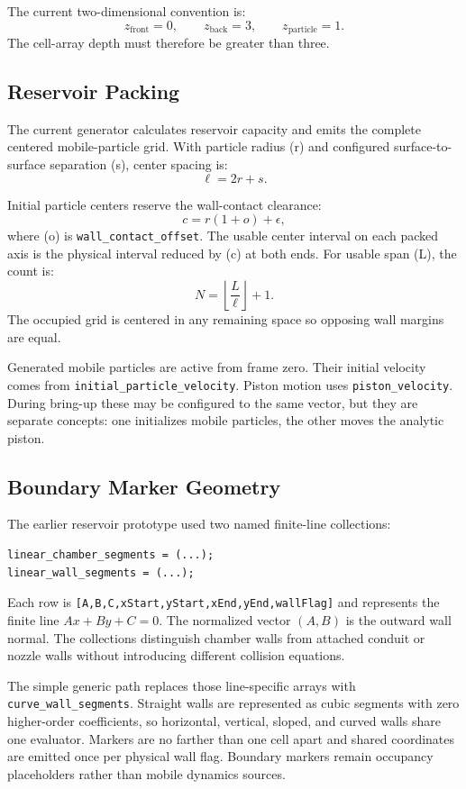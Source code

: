 The current two-dimensional convention is:
\[
z_{\mathrm{front}}=0,\qquad
z_{\mathrm{back}}=3,\qquad
z_{\mathrm{particle}}=1.
\]
The cell-array depth must therefore be greater than three.

\subsection{Reservoir Packing}

The current generator calculates reservoir capacity and emits the complete
centered mobile-particle grid.  With particle radius (r) and configured
surface-to-surface separation (s), center spacing is:
\[
\ell=2r+s.
\]

Initial particle centers reserve the wall-contact clearance:
\[
c=r(1+o)+\epsilon,
\]
where (o) is \texttt{wall\_contact\_offset}.  The usable center interval
on each packed axis is the physical interval reduced by (c) at both ends.
For usable span (L), the count is:
\[
N=\left\lfloor\frac{L}{\ell}\right\rfloor+1.
\]
The occupied grid is centered in any remaining space so opposing wall margins
are equal.

Generated mobile particles are active from frame zero.  Their initial velocity
comes from \texttt{initial\_particle\_velocity}.  Piston motion uses
\texttt{piston\_velocity}.  During bring-up these may be configured to the
same vector, but they are separate concepts: one initializes mobile
particles, the other moves the analytic piston.

\subsection{Boundary Marker Geometry}

The earlier reservoir prototype used two named finite-line collections:
\begin{verbatim}
linear_chamber_segments = (...);
linear_wall_segments = (...);
\end{verbatim}
Each row is \texttt{[A,B,C,xStart,yStart,xEnd,yEnd,wallFlag]} and represents
the finite line \(Ax+By+C=0\).  The normalized vector \((A,B)\) is the outward
wall normal.  The collections distinguish chamber walls from attached
conduit or nozzle walls without introducing different collision equations.

The simple generic path replaces those line-specific arrays with
\texttt{curve\_wall\_segments}.  Straight walls are represented as cubic
segments with zero higher-order coefficients, so horizontal, vertical,
sloped, and curved walls share one evaluator.  Markers are no farther than one
cell apart and shared coordinates are emitted once per physical wall flag.
Boundary markers remain occupancy placeholders rather than mobile dynamics
sources.

